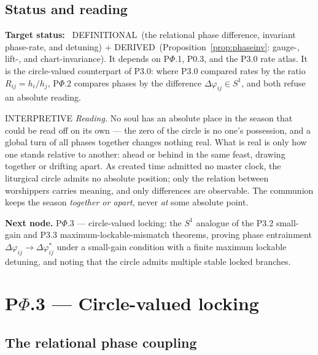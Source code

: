 \documentclass[11pt,a4paper]{article}
\newcommand{\stDerived}{\textcolor{cDer}{\textsf{\small DERIVED}}}
\newcommand{\stDef}{\textcolor{cDef}{\textsf{\small DEFINITIONAL}}}
\newcommand{\stInterp}{\textcolor{cInt}{\textsf{\small INTERPRETIVE}}}
\theoremstyle{definition}
\theoremstyle{plain}
\theoremstyle{remark}
\begin{document}
\subsection{Status and reading}

\textbf{Target status:}~
\stDef\ (the relational phase difference, invariant phase-rate, and detuning) \(+\)
\stDerived\ (Proposition~\ref{prop:phaseinv}: gauge-, lift-, and chart-invariance). It depends
on P$\Phi$.1, P0.3, and the P3.0 rate atlas. It is the circle-valued counterpart of P3.0:
where P3.0 compared rates by the ratio \(R_{ij}=h_i/h_j\), P$\Phi$.2 compares phases by the
difference \(\Delta\varphi_{ij}\in S^1\), and both refuse an absolute reading.

\medskip
\stInterp\quad
\emph{Reading.}
No soul has an absolute place in the season that could be read off on its own --- the zero of
the circle is no one's possession, and a global turn of all phases together changes nothing
real. What is real is only how one stands relative to another: ahead or behind in the same
feast, drawing together or drifting apart. As created time admitted no master clock, the
liturgical circle admits no absolute position; only the relation between worshippers carries
meaning, and only differences are observable. The communion keeps the season \emph{together
or apart}, never \emph{at} some absolute point.

\medskip
\textbf{Next node.} P$\Phi$.3 --- circle-valued locking: the \(S^1\) analogue of the P3.2
small-gain and P3.3 maximum-lockable-mismatch theorems, proving phase entrainment
\(\Delta\varphi_{ij}\to\Delta\varphi_{ij}^{*}\) under a small-gain condition with a finite
maximum lockable detuning, and noting that the circle admits multiple stable locked branches.

\section{P$\Phi$.3 --- Circle-valued locking}

\subsection{The relational phase coupling}
\end{document}
